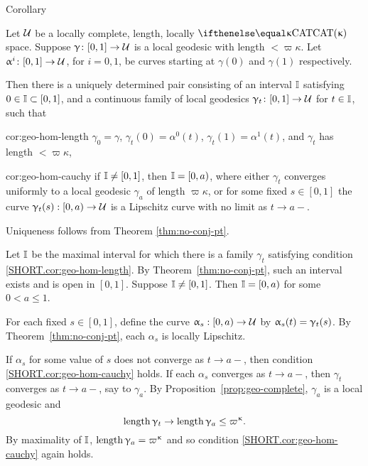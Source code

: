 \begin{thm}{Corollary}\label{cor:geo-hom}{\sloppy 
Let $\mathcal{U}$ be a locally complete, length, locally $\CAT\kappa$ space.
Suppose $\gamma\:[0,1]\to\spc{U}$ is a local geodesic with length $< \varpi\kappa$.  Let $\alpha^i\:[0,1]\to \spc{U}$, for $i=0,1$, be curves starting at $\gamma(0)$ and $\gamma(1)$ respectively.  

}

Then there is a uniquely determined pair consisting of an interval $\mathbb{I} $ satisfying $0\in \II\subset[0,1]$, and a continuous family of local geodesics $\gamma_t\:[0,1]\to \spc{U}$ for  $t\in \II$, such that  

\begin{subthm}{cor:geo-hom-length}
$\gamma_0=\gamma$, $\gamma_t(0)=\alpha^0(t)$, $\gamma_t(1)=\alpha^1(t)$, and $\gamma_t$ has length $< \varpi\kappa$,
\end{subthm} 

\begin{subthm}{cor:geo-hom-cauchy}
if $\mathbb{I}\ne [0,1]$, then $\mathbb{I}=[0, a)$, where either $\gamma_t$ converges uniformly to a local geodesic $\gamma_a$ of length $\varpi\kappa$, or 
for some fixed $s\in [0,1]$ the curve $\gamma_t(s):[0,a)\to\spc{U}$ is a Lipschitz curve with no limit 
as $t\to a-$.
\end{subthm}

\end{thm}


 Uniqueness follows from  Theorem \ref{thm:no-conj-pt}.

Let $\mathbb{I}$ be the maximal interval for which there is a family $\gamma_t$ satisfying condition \ref{SHORT.cor:geo-hom-length}. 
By Theorem~\ref{thm:no-conj-pt}, such an interval exists and is open in $[0,1]$.  Suppose $\mathbb{I}\ne[0,1]$.
Then  $\mathbb{I}=[0,a)$ for some $0<a\le 1$.

For each fixed $s\in [0,1]$, define the curve $\alpha_s:[0,a)\to\spc{U}$ by $\alpha_s(t)\z=\gamma_t(s)$. 
By Theorem~\ref{thm:no-conj-pt}, 
each $\alpha_s$ is locally Lipschitz.  

If $\alpha_s$ for some value of $s$ does not converge as $t\to a-$, then condition \ref{SHORT.cor:geo-hom-cauchy} holds.
If each $\alpha_s$  converges as $t\to a-$, then $ \gamma_t$ converges as $t\to a-$, say to $\gamma_a$.
By  Proposition~\ref{prop:geo-complete}, $\gamma_a$ is a local geodesic and\[\length\gamma_t\to\length\gamma_a\le \varpi\kappa.\]
By maximality of $\mathbb{I}$, $\length\gamma_a=\varpi\kappa$ and so condition \ref{SHORT.cor:geo-hom-cauchy} again holds.
\qeds

